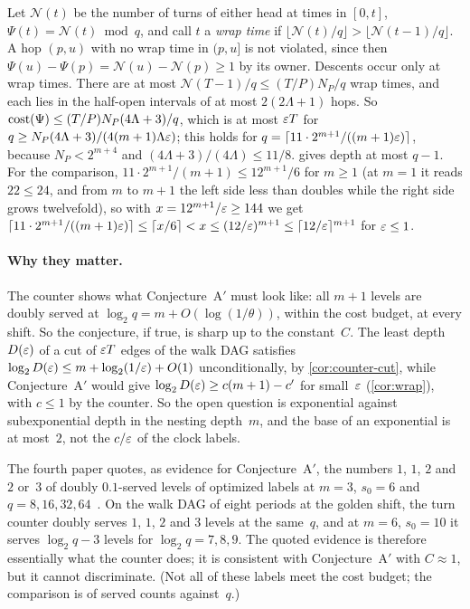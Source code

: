 \begin{informalproof}
Let $\mathcal N(t)$ be the number of turns of either head at times in $[0,t]$, $\Psi(t)=\mathcal N(t)\bmod q$, and call $t$
a \emph{wrap time} if $\lfloor\mathcal N(t)/q\rfloor>\lfloor\mathcal N(t-1)/q\rfloor$. A hop $(p,u)$ with no wrap time
in $(p,u]$ is not violated, since then $\Psi(u)-\Psi(p)=\mathcal N(u)-\mathcal N(p)\ge1$ by its owner. Descents occur only
at wrap times. There are at most $\mathcal N(T-1)/q\le(T/P)N_P/q$ wrap times, and each lies in the half-open intervals of
at most $2(2\Lambda+1)$ hops. So $\mathrm{cost}(\Psi)\le(T/P)N_P(4\Lambda+3)/q$, which is at most $\varepsilon T$ for
$q\ge N_P(4\Lambda+3)/(4(m+1)\Lambda\varepsilon)$; this holds for $q=\lceil11\cdot2^{m+1}/((m+1)\varepsilon)\rceil$, because
$N_P<2^{m+4}$ and $(4\Lambda+3)/(4\Lambda)\le11/8$.  gives depth at most $q-1$. For the comparison,
$11\cdot2^{m+1}/(m+1)\le12^{m+1}/6$ for $m\ge1$ (at $m=1$ it reads $22\le24$, and from $m$ to $m+1$ the left side less
than doubles while the right side grows twelvefold), so with $x=12^{m+1}/\varepsilon\ge144$ we get
$\lceil11\cdot2^{m+1}/((m+1)\varepsilon)\rceil\le\lceil x/6\rceil<x\le(12/\varepsilon)^{m+1}\le\lceil12/\varepsilon\rceil^{m+1}$ for
$\varepsilon\le1$.
\end{informalproof}

\paragraph{Why they matter.} The counter shows what Conjecture~A$'$ must look like: all $m+1$ levels are doubly served
at $\log_2q=m+O(\log(1/\theta))$, within the cost budget, at every shift. So the conjecture, if true, is sharp up to the
constant~$C$. The least depth $D(\varepsilon)$ of a cut of $\varepsilon T$ edges of the walk DAG satisfies
$\log_2D(\varepsilon)\le m+\log_2(1/\varepsilon)+O(1)$ unconditionally, by \cref{cor:counter-cut}, while Conjecture~A$'$ would give $\log_2D(\varepsilon)\ge c(m+1)-c'$ for small~$\varepsilon$ (\cref{cor:wrap}), with $c\le1$ by the counter. So the open question is
exponential against subexponential depth in the nesting depth~$m$, and the base of an exponential is at most~$2$, not the
$c/\varepsilon$ of the clock labels.

\begin{remark}\label{rem:counter-evidence}
The fourth paper quotes, as evidence for Conjecture~A$'$, the numbers $1$, $1$, $2$ and $2$ or~$3$ of doubly
$0.1$-served levels of optimized labels at $m=3$, $s_0=6$ and $q=8,16,32,64$~\cite[Remark~5.26]{FourthPaper2026}. On the
walk DAG of eight periods at the golden shift, the turn counter doubly serves $1$, $1$, $2$ and $3$ levels at the same~$q$,
and at $m=6$, $s_0=10$ it serves $\log_2q-3$ levels for $\log_2q=7,8,9$. The quoted evidence is therefore essentially
what the counter does; it is consistent with Conjecture~A$'$ with $C\approx1$, but it cannot discriminate. (Not all of
these labels meet the cost budget; the comparison is of served counts against~$q$.)
\end{remark}

